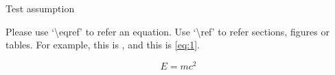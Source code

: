 \begin{tempsection}
    \begin{assumption}
        Test assumption
    \end{assumption}

    Please use `\textbackslash eqref' to refer an equation. Use `\textbackslash ref' to refer sections, figures or tables. For example, this is , and this is \eqref{eq:1}.

    \begin{equation}
        E = mc^2
        \label{eq:1}
    \end{equation}

\end{tempsection}